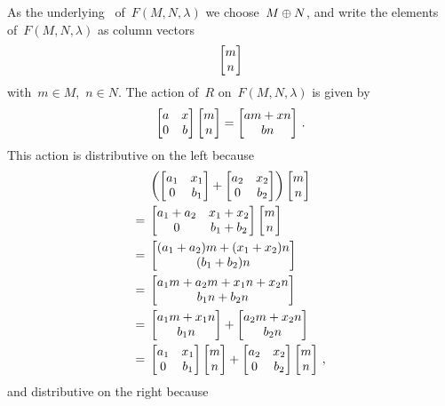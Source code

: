 As the underlying~{} of~$F(M,N,\lambda)$ we choose~$M \oplus N$, and write the elements of~$F(M,N,\lambda)$ as column vectors
\[
  \begin{bmatrix} m \\ n \end{bmatrix}
\]
with~$m \in M$,~$n \in N$.
The action of~$R$ on~$F(M,N,\lambda)$ is given by
\[
    \begin{bmatrix}
      a & x \\
      0 & b
    \end{bmatrix}
    \begin{bmatrix} m \\ n \end{bmatrix}
  = \begin{bmatrix}  am + xn \\ bn  \end{bmatrix} \,.
\]
This action is distributive on the left because
\begin{align*}
  {}&
  \left(
    \begin{bmatrix}
      a_1 & x_1 \\
      0   & b_1
    \end{bmatrix}
    +
    \begin{bmatrix}
      a_2 & x_2 \\
      0   & b_2
    \end{bmatrix}
  \right)
  \begin{bmatrix} m \\ n \end{bmatrix}
  \\
  ={}&
  \begin{bmatrix}
    a_1 + a_2 & x_1 + x_2 \\
    0         & b_1 + b_2
  \end{bmatrix}
  \begin{bmatrix} m \\ n \end{bmatrix}
  \\
  ={}&
  \begin{bmatrix}  (a_1 + a_2) m + (x_1 + x_2) n \\ (b_1 + b_2) n   \end{bmatrix}
  \\
  ={}&
  \begin{bmatrix}  a_1 m + a_2 m + x_1 n + x_2 n \\ b_1 n + b_2 n  \end{bmatrix}
  \\
  ={}&
    \begin{bmatrix}  a_1 m + x_1 n \\ b_1 n  \end{bmatrix}
  + \begin{bmatrix}  a_2 m + x_2 n \\ b_2 n  \end{bmatrix}
  \\
  ={}&
  \begin{bmatrix}
    a_1 & x_1 \\
    0   & b_1
  \end{bmatrix}
  \begin{bmatrix} m \\ n \end{bmatrix}
  +
  \begin{bmatrix}
    a_2 & x_2 \\
    0   & b_2
  \end{bmatrix}
  \begin{bmatrix} m \\ n \end{bmatrix} \,,
\end{align*}
and distributive on the right because
